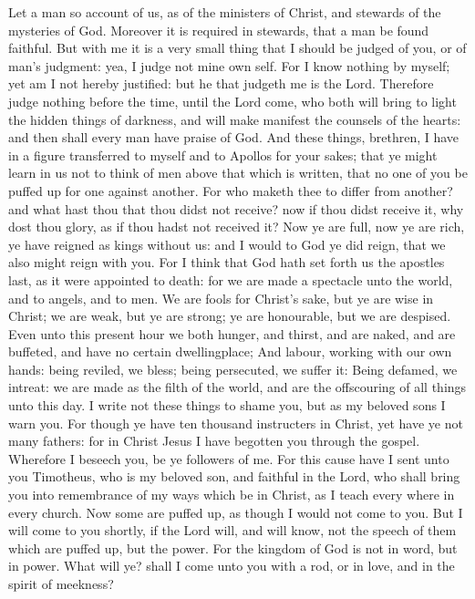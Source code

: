  Let a man so account of us, as of the ministers of
Christ, and stewards of the mysteries of God.  Moreover it
is required in stewards, that a man be found faithful. 
But with me it is a very small thing that I should be judged of you, or
of man's judgment: yea, I judge not mine own self.  For I
know nothing by myself; yet am I not hereby justified: but he that
judgeth me is the Lord.  Therefore judge nothing before
the time, until the Lord come, who both will bring to light the hidden
things of darkness, and will make manifest the counsels of the hearts:
and then shall every man have praise of God.  And these
things, brethren, I have in a figure transferred to myself and to
Apollos for your sakes; that ye might learn in us not to think of men
above that which is written, that no one of you be puffed up for one
against another.  For who maketh thee to differ from
another? and what hast thou that thou didst not receive? now if thou
didst receive it, why dost thou glory, as if thou hadst not received it?
 Now ye are full, now ye are rich, ye have reigned as
kings without us: and I would to God ye did reign, that we also might
reign with you.  For I think that God hath set forth us
the apostles last, as it were appointed to death: for we are made a
spectacle unto the world, and to angels, and to men.  We
are fools for Christ's sake, but ye are wise in Christ; we are weak, but
ye are strong; ye are honourable, but we are despised. 
Even unto this present hour we both hunger, and thirst, and are naked,
and are buffeted, and have no certain dwellingplace;  And
labour, working with our own hands: being reviled, we bless; being
persecuted, we suffer it:  Being defamed, we intreat: we
are made as the filth of the world, and are the offscouring of all
things unto this day.  I write not these things to shame
you, but as my beloved sons I warn you.  For though ye
have ten thousand instructers in Christ, yet have ye not many fathers:
for in Christ Jesus I have begotten you through the gospel.
 Wherefore I beseech you, be ye followers of me.
 For this cause have I sent unto you Timotheus, who is my
beloved son, and faithful in the Lord, who shall bring you into
remembrance of my ways which be in Christ, as I teach every where in
every church.  Now some are puffed up, as though I would
not come to you.  But I will come to you shortly, if the
Lord will, and will know, not the speech of them which are puffed up,
but the power.  For the kingdom of God is not in word,
but in power.  What will ye? shall I come unto you with a
rod, or in love, and in the spirit of meekness?

